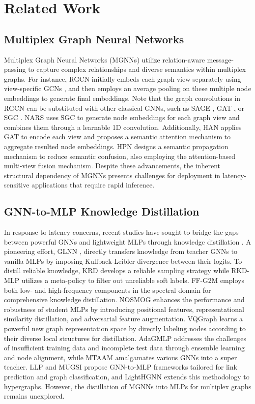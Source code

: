 \section{Related Work}
\subsection{Multiplex Graph Neural Networks}
Multiplex Graph Neural Networks (MGNNs) utilize relation-aware message-passing to capture complex relationships and diverse semantics within multiplex graphs. For instance, RGCN \cite{RGCN} initially embeds each graph view separately using view-specific GCNs \cite{GCN}, and then employs an average pooling on these multiple node embeddings to generate final embeddings. Note that the graph convolutions in RGCN can be substituted with other classical GNNs, such as SAGE \cite{SAGE}, GAT \cite{GAT}, or SGC \cite{SGC}. NARS \cite{NARS} uses SGC to generate node embeddings for each graph view and combines them through a learnable 1D convolution. Additionally, HAN \cite{HAN} applies GAT to encode each view and proposes a semantic attention mechanism to aggregate resulted node embeddings. HPN \cite{HPN} designs a semantic propagation mechanism to reduce semantic confusion, also employing the attention-based multi-view fusion mechanism. Despite these advancements, the inherent structural dependency of MGNNs presents challenges for deployment in latency-sensitive applications that require rapid inference.

\subsection{GNN-to-MLP Knowledge Distillation}
In response to latency concerns, recent studies have sought to bridge the gaps between powerful GNNs and lightweight MLPs through knowledge distillation \cite{KD}. A pioneering effort, GLNN \cite{GLNN}, directly transfers knowledge from teacher GNNs to vanilla MLPs by imposing Kullback-Leibler divergence between their logits. To distill reliable knowledge, KRD \cite{KRD} develops a reliable sampling strategy while RKD-MLP \cite{RKD-MLP} utilizes a meta-policy to filter out unreliable soft labels. FF-G2M \cite{FF-G2M} employs both low- and high-frequency components in the spectral domain for comprehensive knowledge distillation. NOSMOG \cite{NOSMOG} enhances the performance and robustness of student MLPs by introducing positional features, representational similarity distillation, and adversarial feature augmentation. VQGraph \cite{VQGraph} learns a powerful new graph representation space by directly labeling nodes according to their diverse local structures for distillation. AdaGMLP \cite{AdaGMLP} addresses the challenges of insufficient training data and incomplete test data through ensemble learning and node alignment, while MTAAM \cite{MTAAM} amalgamates various GNNs into a super teacher. 
LLP \cite{LLP} and MUGSI \cite{MuGSI} propose GNN-to-MLP frameworks tailored for link prediction and graph classification, and LightHGNN \cite{LightHGNN} extends this methodology to hypergraphs. However, the distillation of MGNNs into MLPs for multiplex graphs remains unexplored.